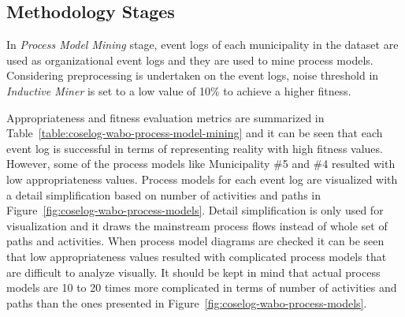 \subsection{Methodology Stages}
\label{sec:coselog-methodology}
In \textit{Process Model Mining} stage, event logs of each municipality in the dataset are used as organizational event logs and they are used to mine process models. Considering preprocessing is undertaken on the event logs, noise threshold in \textit{Inductive Miner} is set to a low value of 10\% to achieve a higher fitness. 

Appropriateness and fitness evaluation metrics are summarized in Table~\ref{table:coselog-wabo-process-model-mining} and it can be seen that each event log is successful in terms of representing reality with high fitness values. However, some of the process models like Municipality \#5 and \#4 resulted with low appropriateness values. Process models for each event log are visualized with a detail simplification based on number of activities and paths in Figure~\ref{fig:coselog-wabo-process-models}. Detail simplification is only used for visualization and it draws the mainstream process flows instead of whole set of paths and activities. When process model diagrams are checked it can be seen that low appropriateness values resulted with complicated process models that are difficult to analyze visually. It should be kept in mind that actual process models are 10 to 20 times more complicated in terms of number of activities and paths than the ones presented in Figure~\ref{fig:coselog-wabo-process-models}. 
